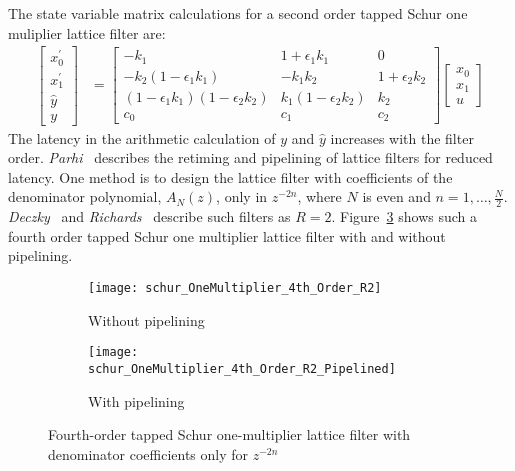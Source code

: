 \documentclass[a4paper,twoside,10pt,english]{article}
\newcommand{\DesignOfSchurLatticeFiltersIncludeScale}{0.85}
\begin{document}
The state variable matrix calculations for a second order tapped Schur one
muliplier lattice filter are:
\begin{align*}
  \left[\begin{array}{c}
    x_{0}^{\prime} \\
    x_{1}^{\prime} \\
    \hat{y} \\
    y\end{array}\right] &= 
  \left[\begin{array}{ccc}- k_{1} & 1+\epsilon_{1} k_{1} & 0\\
-k_{2}\left(1-\epsilon_{1}k_{1}\right) & -k_{1}k_{2}& 1+\epsilon_{2}k_{2} \\
 \left(1-\epsilon_{1}k_{1}\right)\left(1-\epsilon_{2}k_{2}\right) &
   k_{1}\left(1-\epsilon_{2}k_{2}\right) & k_{2} \\
 c_{0} & c_{1} & c_{2} \end{array}\right] \left[\begin{array}{c}
    x_{0} \\
    x_{1} \\
    u \end{array} \right]
\end{align*}
The latency in the arithmetic calculation of $y$ and $\hat{y}$
increases with the filter order. \emph{Parhi}~\cite[Chapter 4 and Section 12.8]
{Parhi_VLSIDigitalSignalProcessingSystems} describes the retiming and pipelining
of lattice filters for reduced latency. One method is to design the lattice
filter with coefficients of the denominator polynomial, $A_{N}\left(z\right)$,
only in $z^{-2n}$, where $N$ is even and $n=1,\hdots,\frac{N}{2}$.
\emph{Deczky}~\cite{Deczky_MinPSynthesisIIRDigitalFilters} and
\emph{Richards}~\cite{Richards_DeczkyRecursiveDecimator} describe such filters
as $R=2$.
Figure~\ref{fig:Fourth-order-tapped-Schur-one-multiplier-lattice-filter-R2}
shows such a fourth order tapped Schur one multiplier lattice filter with and
without pipelining.

\begin{figure}[!ht]
\begin{subfigure}[b]{\textwidth}
\centering
\texttt{[image: schur\_OneMultiplier\_4th\_Order\_R2]}
\caption{Without pipelining}
\label{subfig:Fourth-order-tapped-Schur-one-multiplier-lattice-R2-without}
\end{subfigure}
\begin{subfigure}[b]{\textwidth}
\centering
\texttt{[image: schur\_OneMultiplier\_4th\_Order\_R2\_Pipelined]}
\caption{With pipelining}
\label{subfig:Fourth-order-tapped-Schur-one-multiplier-lattice-R2-with}
\end{subfigure}
\caption{Fourth-order tapped Schur one-multiplier lattice filter with denominator
  coefficients only for $z^{-2n}$}
\label{fig:Fourth-order-tapped-Schur-one-multiplier-lattice-filter-R2}
\end{figure}
\end{document}
